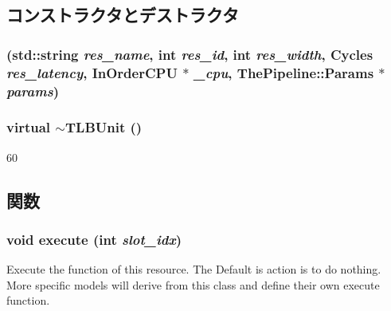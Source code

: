 \subsection{コンストラクタとデストラクタ}
\hypertarget{classTLBUnit_a08b80cd9315a97384c41fcab5e237316}{
\subsubsection[{TLBUnit}]{ (std::string {\em res\_\-name}, \/  int {\em res\_\-id}, \/  int {\em res\_\-width}, \/  {\bf Cycles} {\em res\_\-latency}, \/  {\bf InOrderCPU} $\ast$ {\em \_\-cpu}, \/  {\bf ThePipeline::Params} $\ast$ {\em params})}}
\label{classTLBUnit_a08b80cd9315a97384c41fcab5e237316}
\hypertarget{classTLBUnit_a715a453817a86ac44d004bbb01e58dbb}{
\subsubsection[{$\sim$TLBUnit}]{\setlength{\rightskip}{0pt plus 5cm}virtual $\sim${\bf TLBUnit} ()}}
\label{classTLBUnit_a715a453817a86ac44d004bbb01e58dbb}



\begin{DoxyCode}
60 {}
\end{DoxyCode}


\subsection{関数}
\hypertarget{classTLBUnit_a7b7fff82f8c9cbdb02add1346f60bb9e}{
\subsubsection[{execute}]{\setlength{\rightskip}{0pt plus 5cm}void execute (int {\em slot\_\-idx})}}
\label{classTLBUnit_a7b7fff82f8c9cbdb02add1346f60bb9e}
Execute the function of this resource. The Default is action is to do nothing. More specific models will derive from this class and define their own execute function. 

